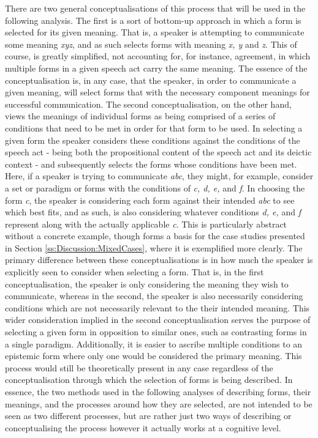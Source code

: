 There are two general conceptualisations of this process that will be used in the following analysis. The first is a sort of bottom-up approach in which a form is selected for its given meaning. That is, a speaker is attempting to communicate some meaning \textit{xyz}, and as such selects forms with meaning \textit{x, y} and \textit{z}. This of course, is greatly simplified, not accounting for, for instance, agreement, in which multiple forms in a given speech act carry the same meaning. The essence of the conceptualisation is, in any case, that the speaker, in order to communicate a given meaning, will select forms that with the necessary component meanings for successful communication. The second conceptualisation, on the other hand, views the meanings of individual forms as being comprised of a series of conditions that need to be met in order for that form to be used. In selecting a given form the speaker considers these conditions against the conditions of the speech act - being both the propositional content of the speech act and its deictic context - and subsequently selects the forms whose conditions have been met. Here, if a speaker is trying to communicate \textit{abc}, they might, for example, consider a set or paradigm or forms with the conditions of \textit{c, d, e,} and \textit{f}. In choosing the form \textit{c}, the speaker is considering each form against their intended \textit{abc} to see which best fits, and as such, is also considering whatever conditions \textit{d, e,} and \textit{f} represent along with the actually applicable \textit{c}. This is particularly abstract without a concrete example, though forms a basis for the case studies presented in Section \ref{ss:Discussion:MixedCases}, where it is exemplified more clearly. The primary difference between these conceptualisations is in how much the speaker is explicitly seen to consider when selecting a form. That is, in the first conceptualisation, the speaker is only considering the meaning they wish to communicate, whereas in the second, the speaker is also necessarily considering conditions which are not necessarily relevant to the their intended meaning. This wider consideration implied in the second conceptualisation serves the purpose of selecting a given form in opposition to similar ones, such as contrasting forms in a single paradigm. Additionally, it is easier to ascribe multiple conditions to an epistemic form where only one would be considered the primary meaning. This process would still be theoretically present in any case regardless of the conceptualisation through which the selection of forms is being described. In essence, the two methods used in the following analyses of describing forms, their meanings, and the processes around how they are selected, are not intended to be seen as two different processes, but are rather just two ways of describing or conceptualising the process however it actually works at a cognitive level.


